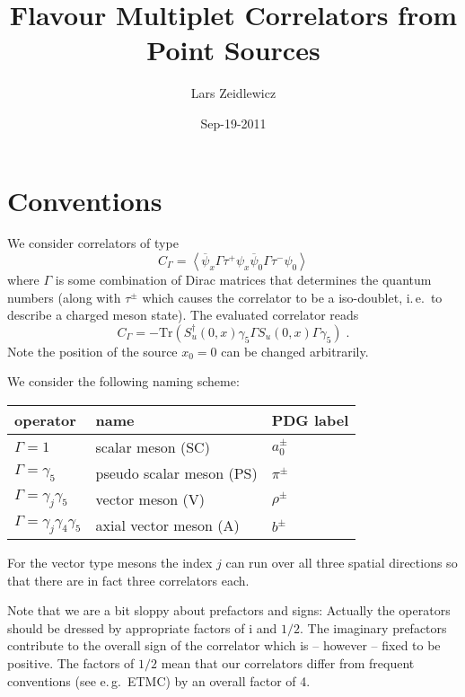 \documentclass[a4paper]{article}
\newcommand{\psibar}{\ensuremath{\overline\psi}}
\newcommand{\vev}[1]{\ensuremath{\left<#1\right>}}
\newcommand{\ii}{\ensuremath{\text{i}}}
\begin{document}
\author{Lars Zeidlewicz}
\date{Sep-19-2011}
\title{Flavour Multiplet Correlators from Point Sources}
\maketitle

\section{Conventions}

We consider correlators of type
\begin{equation}
C_\Gamma = \vev{\psibar_x \Gamma \tau^+ \psi_x \psibar_0 \Gamma \tau^- \psi_0}
\end{equation}
where $\Gamma$ is some combination of Dirac matrices that determines the quantum numbers (along with $\tau^\pm$ which causes the correlator to be a iso-doublet, i.\,e.\ to describe a charged meson state). The evaluated correlator reads
\begin{equation}
C_\Gamma = - \text{Tr} \left( S_u^\dagger(0,x) \gamma_5 \Gamma S_u(0,x) \Gamma \gamma_5 \right)\;.
\end{equation}
Note the position of the source $x_0 = 0$ can be changed arbitrarily.

We consider the following naming scheme:

\begin{tabular}{|lll|}
\hline
operator                           & name                      & PDG label\\
\hline\hline
$\Gamma = 1$                       & scalar meson (SC)         & $a_0^\pm$ \\
$\Gamma = \gamma_5$                & pseudo scalar meson (PS)  & $\pi^\pm$ \\
$\Gamma = \gamma_j\gamma_5$        & vector meson (V)          & $\rho^\pm$ \\
$\Gamma = \gamma_j\gamma_4\gamma_5$& axial vector meson (A)    & $b^\pm$\\
\hline
\end{tabular}

For the vector type mesons the index $j$ can run over all three spatial directions so that there are in fact three correlators each. 

Note that we are a bit sloppy about prefactors and signs: Actually the operators should be dressed by appropriate factors of $\ii$ and $1/2$. The imaginary prefactors contribute to the overall sign of the correlator which is -- however -- fixed to be positive. The factors of $1/2$ mean that our correlators differ from frequent conventions (see e.\,g.\ ETMC) by an overall factor of 4.
\end{document}
